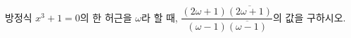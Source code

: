 방정식 $x^3+1=0$의 한 허근을 $\omega$라 할 때, $\dfrac{(2\omega+1)\overline{(2\omega+1)}}{(\omega-1)\overline{(\omega-1)}}$의 값을 구하시오. 
